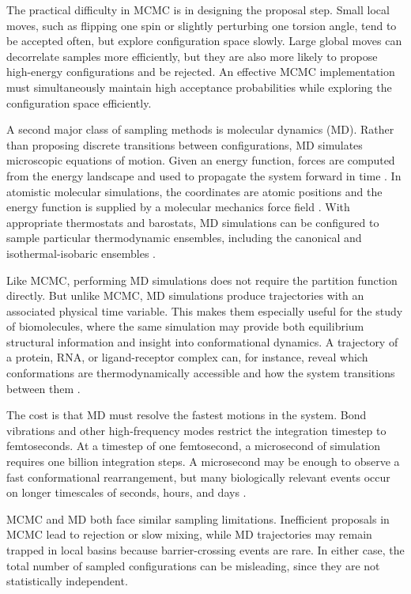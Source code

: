 The practical difficulty in MCMC is in designing the proposal step. Small local moves, such as flipping one spin or slightly perturbing one torsion angle, tend to be accepted often, but explore configuration space slowly. Large global moves can decorrelate samples more efficiently, but they are also more likely to propose high-energy configurations and be rejected. An effective MCMC implementation must simultaneously maintain high acceptance probabilities while exploring the configuration space efficiently.

A second major class of sampling methods is molecular dynamics (MD). Rather than proposing discrete transitions between configurations, MD simulates microscopic equations of motion. Given an energy function, forces are computed from the energy landscape and used to propagate the system forward in time \citep{verlet1967computer,allen2017computer}. In atomistic molecular simulations, the coordinates are atomic positions and the energy function is supplied by a molecular mechanics force field \citep{Wang2004GAFF,Vanommeslaeghe2010CGenFF}. With appropriate thermostats and barostats, MD simulations can be configured to sample particular thermodynamic ensembles, including the canonical and isothermal-isobaric ensembles \citep{nose--hoover,hoover,Bussi_Parrinello_thermostat,Parrinello_Rahman_dynamics}.

Like MCMC, performing MD simulations does not require the partition function directly. But unlike MCMC, MD simulations produce trajectories with an associated physical time variable. This makes them especially useful for the study of biomolecules, where the same simulation may provide both equilibrium structural information and insight into conformational dynamics. A trajectory of a protein, RNA, or ligand-receptor complex can, for instance, reveal which conformations are thermodynamically accessible and how the system transitions between them \citep{allen2017computer}.

The cost is that MD must resolve the fastest motions in the system. Bond vibrations and other high-frequency modes restrict the integration timestep to femtoseconds. At a timestep of one femtosecond, a microsecond of simulation requires one billion integration steps. A microsecond may be enough to observe a fast conformational rearrangement, but many biologically relevant events occur on longer timescales of seconds, hours, and days \citep{allen2017computer}.

MCMC and MD both face similar sampling limitations. Inefficient proposals in MCMC lead to rejection or slow mixing, while MD trajectories may remain trapped in local basins because barrier-crossing events are rare. In either case, the total number of sampled configurations can be misleading, since they are not statistically independent.

